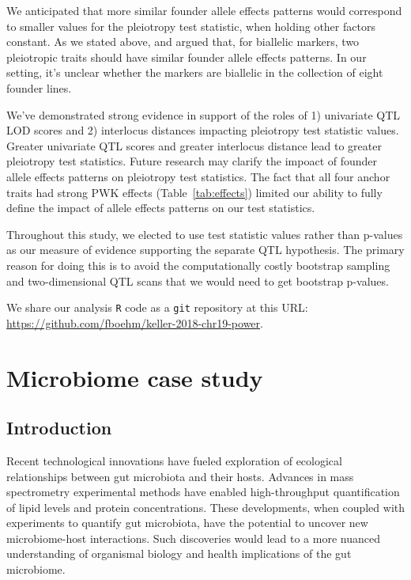 \documentclass[oneside]{book}\usepackage[]{graphicx}\usepackage[]{color}
\begin{document}
We anticipated that more similar founder allele effects patterns would correspond to 
smaller values for the pleiotropy test statistic, when holding other factors constant.
As we stated above, \citet{macdonald2007joint} and \citet{king2012genetic} argued that,
for biallelic markers, two pleiotropic traits should have similar founder allele effects patterns. 
In our setting, it's unclear whether the markers are biallelic in the collection of eight founder lines.

We've demonstrated strong evidence in support of the roles of 1) univariate QTL LOD scores and
2) interlocus distances impacting pleiotropy test statistic values. 
Greater univariate QTL scores and greater interlocus distance lead to greater pleiotropy test statistics. 
Future research may clarify the impoact of founder allele effects patterns on pleiotropy test statistics. 
The fact that all four anchor traits had strong PWK effects (Table~\ref{tab:effects}) limited
our ability to fully define the impact of allele effects patterns on our test statistics.

Throughout this study, we elected to use test statistic values rather than p-values as 
our measure of evidence supporting the separate QTL hypothesis.
The primary reason for doing this is to avoid the computationally costly bootstrap
sampling and two-dimensional QTL scans that we would need to get bootstrap p-values.

We share our analysis \texttt{R} code \citep{r} as a \texttt{git}
repository at this URL: \url{https://github.com/fboehm/keller-2018-chr19-power}.




\section{Microbiome case study}
\subsection{Introduction}

Recent technological innovations have fueled exploration of ecological relationships between gut microbiota and their hosts. 
Advances in mass spectrometry experimental methods have enabled high-throughput quantification of lipid levels and protein concentrations. 
These developments, when coupled with experiments to quantify gut microbiota, have the potential to uncover new microbiome-host interactions. 
Such discoveries would lead to a more nuanced understanding of organismal biology and health implications of the gut microbiome. 
\end{document}
